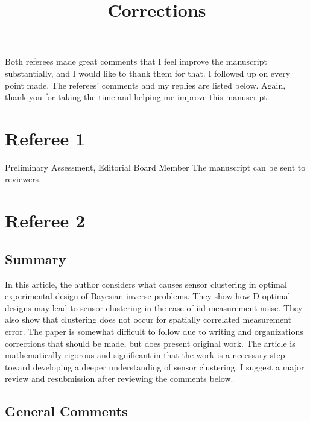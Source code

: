 \documentclass{amsart}
\title{Corrections}
\begin{document}
\maketitle

Both referees made great comments that I feel improve the manuscript
substantially, and I would like to thank them for that. I followed up
on every point made. The referees' comments and my replies are listed
below. Again, thank you for taking the time and helping me improve
this manuscript.

\section{Referee 1}
Preliminary Assessment, Editorial Board Member The manuscript can be
sent to reviewers.


\section{Referee 2}
\subsection{Summary}
In this article, the author considers what causes sensor clustering in
optimal experimental design of Bayesian inverse problems. They show
how D-optimal designs may lead to sensor clustering in the case of iid
measurement noise. They also show that clustering does not occur for
spatially correlated measurement error. The paper is somewhat
difficult to follow due to writing and organizations corrections that
should be made, but does present original work. The article is
mathematically rigorous and significant in that the work is a
necessary step toward developing a deeper understanding of sensor
clustering. I suggest a major review and resubmission after reviewing
the comments below.


\subsection{General Comments}
\end{document}
